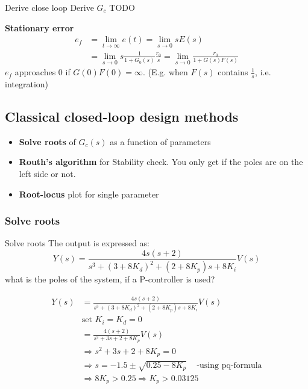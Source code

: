 \documentclass{article}
\begin{document}
\begin{exampleblock}{Derive close loop}
    Derive $G_c$ TODO
\end{exampleblock}

\textbf{Stationary error}
\begin{align*}
    e_f &= \lim_{t\to\infty}e(t) = \lim_{s\to0}sE(s) \\
    &= \lim_{s\to0}s\frac{1}{1+G_0(s)}\frac{r_0}{s} = \lim_{s\to0} \frac{r_0}{1+G(s)F(s)}
\end{align*}
$e_f$ approaches $0$ if $G(0)F(0)=\infty$. (E.g. when $F(s)$ contains $\frac{1}{s}$, i.e. integration)


\subsection{Classical closed-loop design methods}
\begin{itemize}
    \item \textbf{Solve roots} of $G_c(s)$ as a function of parameters
    \item \textbf{Routh's algorithm} for Stability check. You only get if the poles are on the left side or not.
    \item \textbf{Root-locus} plot for single parameter
\end{itemize}

\subsubsection{Solve roots}
\begin{exampleblock}{Solve roots}
    The output is expressed as:
    \begin{equation*}
        Y(s) = \frac{4s(s+2)}{s^3+(3+8K_d)^2+(2+8K_p)s+8K_i}V(s)
    \end{equation*}
    what is the poles of the system, if a P-controller is used?

    \begin{align*}
        Y(s) &= \frac{4s(s+2)}{s^3+(3+8K_d)^2+(2+8K_p)s+8K_i}V(s) \\
        &\text{set } K_i = K_d = 0 \\
        &= \frac{4(s+2)}{s^2+3s+2+8K_p}V(s) \\
        &\Rightarrow s^2+3s+2+8K_p = 0  \\ 
        &\Rightarrow s=-1.5 \pm \sqrt{0.25-8K_p} \;\;\; \text{ -using pq-formula}\\
        &\Rightarrow 8K_p > 0.25 \Rightarrow K_p > 0.03125
    \end{align*}
\end{exampleblock}
\end{document}
